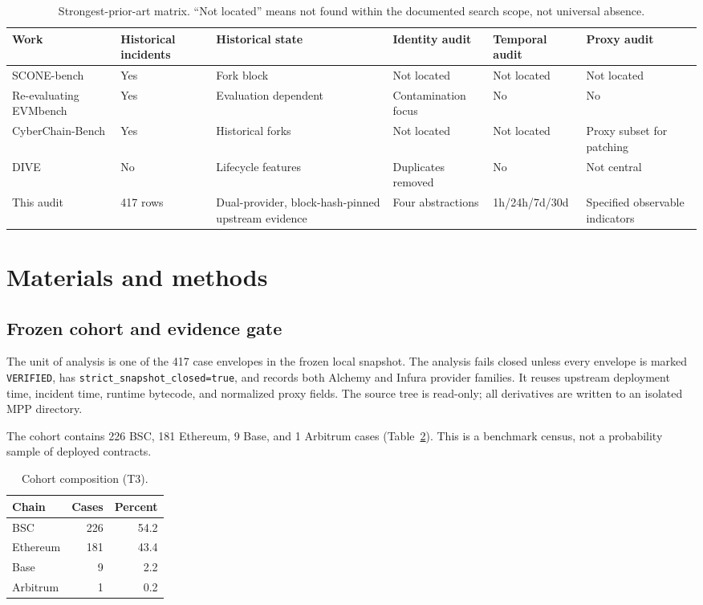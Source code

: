 \documentclass[10pt]{article}
\newcommand{\dataset}{SCONE-bench}
\begin{document}
\begin{table}[t]
\centering\small
\caption{Strongest-prior-art matrix. ``Not located'' means not found within the documented search scope, not universal absence.}
\label{tab:priorart}
\begin{tabularx}{\textwidth}{>{\raggedright\arraybackslash}p{2.5cm}XXXXX}
\toprule
Work & Historical incidents & Historical state & Identity audit & Temporal audit & Proxy audit \\
\midrule
\dataset{} & Yes & Fork block & Not located & Not located & Not located \\
Re-evaluating EVMbench & Yes & Evaluation dependent & Contamination focus & No & No \\
CyberChain-\allowbreak Bench & Yes & Historical forks & Not located & Not located & Proxy subset for patching \\
DIVE & No & Lifecycle features & Duplicates removed & No & Not central \\
This audit & 417 rows & Dual-provider, block-hash-pinned upstream evidence & Four abstractions & 1h/24h/7d/30d & Specified observable indicators \\
\bottomrule
\end{tabularx}
\end{table}

\section{Materials and methods}
\subsection{Frozen cohort and evidence gate}
The unit of analysis is one of the 417 case envelopes in the frozen local snapshot. The analysis fails closed unless every envelope is marked \texttt{VERIFIED}, has \texttt{strict\_snapshot\_closed=true}, and records both Alchemy and Infura provider families. It reuses upstream deployment time, incident time, runtime bytecode, and normalized proxy fields. The source tree is read-only; all derivatives are written to an isolated MPP directory.

The cohort contains 226 BSC, 181 Ethereum, 9 Base, and 1 Arbitrum cases (Table~\ref{tab:cohort}). This is a benchmark census, not a probability sample of deployed contracts.

\begin{table}[h]
\centering
\caption{Cohort composition (T3).}
\label{tab:cohort}
\begin{tabular}{lrr}
\toprule Chain & Cases & Percent \\
\midrule BSC & 226 & 54.2 \\
Ethereum & 181 & 43.4 \\
Base & 9 & 2.2 \\
Arbitrum & 1 & 0.2 \\
\bottomrule
\end{tabular}
\end{table}
\end{document}

